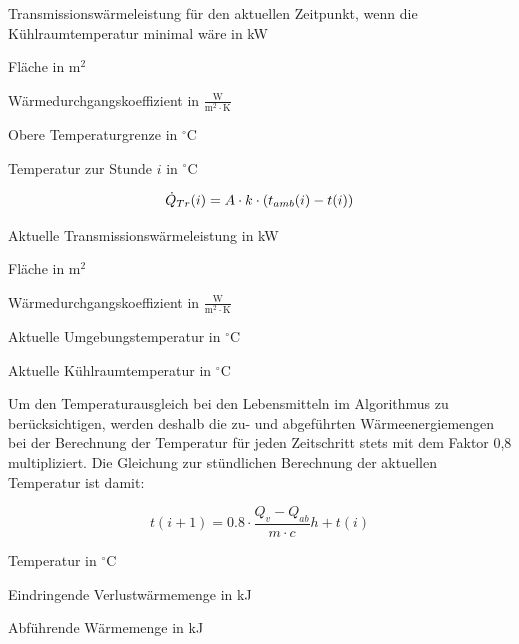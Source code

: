\begin{description}[\dth]

	\item[$\ptransm(i)$] Transmissionswärmeleistung f\"ur den aktuellen
	Zeitpunkt, wenn die K\"uhlraumtemperatur minimal w\"are in kW
	\item[$A$] Fläche in $\mathrm{m^2}$
	\item[$k$] Wärmedurchgangskoeffizient in $\mathrm{\frac{W}{m^2 \cdot
	K}}$
	\item[$t_{max}$] Obere Temperaturgrenze in $ ^{\circ} $C
	\item[$t(i)$] Temperatur zur Stunde $i$ in $ ^{\circ} $C
\end{description}
\vspace{0.5cm}

\begin{equation}
	\ptrans(i) = A \cdot k \cdot \left( t_{amb}(i) -
	t(i) \right)
	\label{ptransi}
\end{equation}

\begin{description}[\dth]

	\item[$\ptrans(i)$] Aktuelle Transmissionswärmeleistung in kW
	\item[$A$] Fläche in $\mathrm{m^2}$
	\item[$k$] Wärmedurchgangskoeffizient in $\mathrm{\frac{W}{m^2 \cdot
	K}}$
	\item[$t_{amb}(i)$] Aktuelle Umgebungstemperatur in $^{\circ}$C
	\item[$t(i)$] Aktuelle Kühlraumtemperatur in $^{\circ}$C
\end{description}
\vspace{0.5cm}

Um den Temperaturausgleich bei den Lebensmitteln im Algorithmus zu
berücksichtigen, werden deshalb die zu- und abgeführten Wärmeenergiemengen bei
der Berechnung der Temperatur für jeden Zeitschritt stets mit dem Faktor 0,8
multipliziert.  Die Gleichung zur stündlichen Berechnung der aktuellen
Temperatur ist damit:

\begin{equation}
	t(i+1) = 0.8 \cdot \frac{Q_v - Q_{ab}}{m \cdot c}h + t(i)
\label{tns}
\end{equation}

\begin{description}[\dth]

	\item[$t$] Temperatur in $^{\circ} $C
	\item[$Q_v$] Eindringende Verlustwärmemenge in kJ
	\item[$Q_{ab}$] Abführende Wärmemenge in kJ

\end{description}
\vspace{0.5cm}

